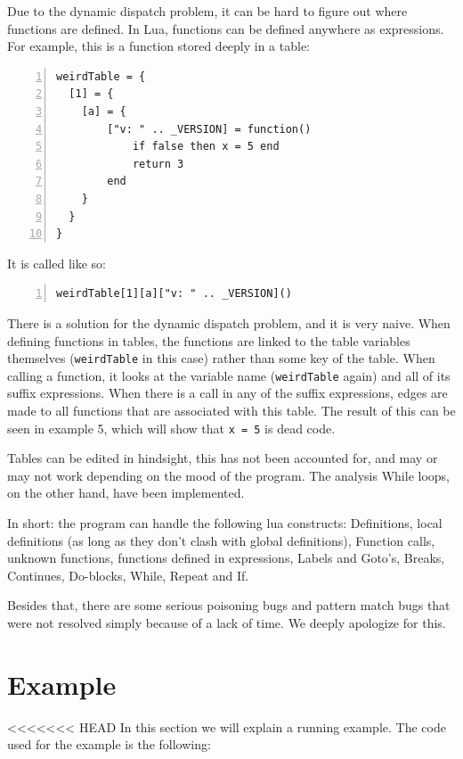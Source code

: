 \documentclass[10pt]{article}
\begin{document}
Due to the dynamic dispatch problem, it can be hard to figure out where functions are defined. In Lua, functions can be defined anywhere as expressions. For example, this is a function stored deeply in a table:
\begin{lstlisting}[frame=single,numbers=left,caption=Running with an example file]
weirdTable = {
  [1] = {
    [a] = {
        ["v: " .. _VERSION] = function()
            if false then x = 5 end
            return 3
        end
    }
  }
}
\end{lstlisting}
It is called like so:
\begin{lstlisting}[frame=single,numbers=left,caption=Running with an example file]
weirdTable[1][a]["v: " .. _VERSION]()
\end{lstlisting}

There is a solution for the dynamic dispatch problem, and it is very naive. When defining functions in tables, the functions are linked to the table variables themselves (\texttt{weirdTable} in this case) rather than some key of the table. When calling a function, it looks at the variable name (\texttt{weirdTable} again) and all of its suffix expressions. When there is a call in any of the suffix expressions, edges are made to all functions that are associated with this table. The result of this can be seen in example 5, which will show that \texttt{x = 5} is dead code.

Tables can be edited in hindsight, this has not been accounted for, and may or may not work depending on the mood of the program. The analysis While loops, on the other hand, have been implemented.

In short: the program can handle the following lua constructs: Definitions, local definitions (as long as they don't clash with global definitions), Function calls, unknown functions, functions defined in expressions, Labels and Goto's, Breaks, Continues, Do-blocks, While, Repeat and If.

Besides that, there are some serious poisoning bugs and pattern match bugs that were not resolved simply because of a lack of time. We deeply apologize for this.


\section{Example}
<<<<<<< HEAD
In this section we will explain a running example. The code used for the example is the following:\\
\end{document}
